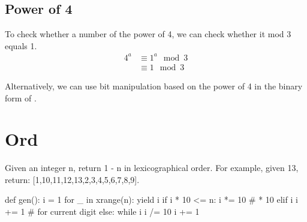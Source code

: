 \subsection{Power of 4}
To check whether a number of the power of 4, we can check whether it mod 3 equals 1.
\begin{align*}
4^a &\equiv 1^a\mod 3 \\
&\equiv 1 \mod 3
\end{align*}

Alternatively, we can use bit manipulation based on the power of 4 in the binary form of . 

\section{Ord}
 Given an integer n, return 1 - n in lexicographical order. For example, given 13, return: [1,10,11,12,13,2,3,4,5,6,7,8,9].

\begin{python}
def gen():
    i = 1
    for _ in xrange(n):
        yield i
        if i * 10 <= n:
            i *= 10  # * 10
        elif i %
            i += 1  # for current digit
        else:
            while i %
                i /= 10
            i += 1
\end{python}
